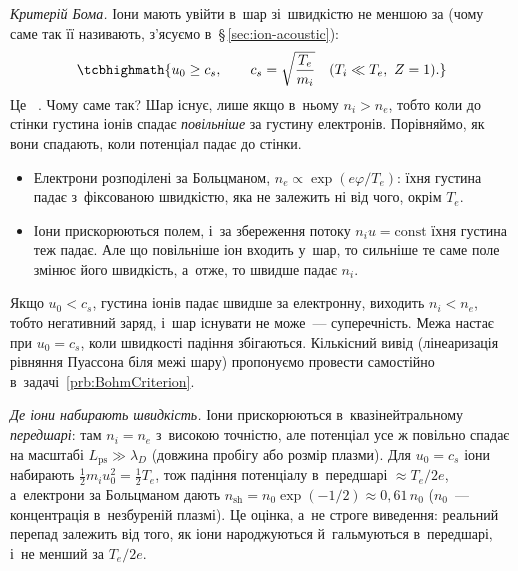 \emph{Критерій Бома.} Іони мають увійти в~шар зі~швидкістю не меншою за
 (чому саме так її називають, з'ясуємо в~§\,\ref{sec:ion-acoustic}):
\begin{equation}\label{eq:bohm-criterion}
	\tcbhighmath{u_0\ge c_s,\qquad c_s=\sqrt{\frac{T_e}{m_i}}\quad(T_i\ll T_e,\ Z=1).}
\end{equation}
Це ~\cite{chen2016introduction}. Чому саме так? Шар існує, лише якщо в~ньому $n_i>n_e$, тобто коли
до стінки густина іонів спадає \emph{повільніше} за густину електронів. Порівняймо, як вони спадають,
коли потенціал падає до стінки.
\begin{itemize}
	\item Електрони розподілені за Больцманом, $n_e\propto\exp(e\varphi/T_e)$: їхня густина падає
	з~фіксованою швидкістю, яка не залежить ні від чого, окрім $T_e$.
	\item Іони прискорюються полем, і~за збереження потоку $n_iu=\mathrm{const}$ їхня густина теж падає.
	Але що повільніше іон входить у~шар, то сильніше те саме поле змінює його швидкість, а~отже,
	то швидше падає $n_i$.
\end{itemize}
Якщо $u_0<c_s$, густина іонів падає швидше за електронну, виходить $n_i<n_e$, тобто негативний заряд, і~шар
існувати не може~--- суперечність. Межа настає при $u_0=c_s$, коли швидкості падіння збігаються.
Кількісний вивід (лінеаризація рівняння Пуассона біля межі шару) пропонуємо провести самостійно в~задачі~\ref{prb:BohmCriterion}.

\emph{Де іони набирають швидкість.} Іони прискорюються в~квазінейтральному \emph{передшарі}: там
$n_i=n_e$ з~високою точністю, але потенціал усе ж повільно спадає на масштабі $L_\mathrm{ps}\gg\lambda_D$ (довжина
пробігу або розмір плазми). Для $u_0=c_s$ іони набирають $\tfrac12m_iu_0^2=\tfrac12T_e$, тож падіння потенціалу
в~передшарі $\approx T_e/2e$, а~електрони за Больцманом дають $n_\mathrm{sh}=n_0\exp(-1/2)\approx0{,}61\,n_0$
($n_0$~--- концентрація в~незбуреній плазмі). Це оцінка, а~не строге виведення: реальний перепад залежить
від того, як іони народжуються й~гальмуються в~передшарі, і~не менший за $T_e/2e$.

